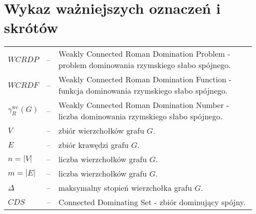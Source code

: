 \chapter*{Wykaz ważniejszych oznaczeń i skrótów}

\begin{tabular}{@{} l l p{} @{}}
    $WCRDP$ & -- & Weakly Connected Roman Domination Problem - problem dominowania rzymskiego słabo spójnego.\\
    $WCRDF$ & -- & Weakly Connected Roman Domination Function - funkcja dominowania rzymskiego słabo spójnego. \\
    $\gamma_{R}^{\text{wc}}(G)$ & -- & Weakly Connected Roman Domination Number - liczba dominowania rzymskiego słabo spójnego. \\
    $V$ & -- & zbiór wierzchołków grafu $G$.\\
    $E$ & -- & zbiór krawędzi grafu $G$.\\
    $n = |V|$ & -- & liczba wierzchołków grafu $G$.\\
    $m = |E|$ & -- & liczba wierzchołków grafu $G$.\\
    $\Delta$ & -- & maksymalny stopień wierzchołka grafu $G$.\\
    $CDS$ & -- & Connected Dominating Set - zbiór dominujący spójny.\\
\end{tabular}
